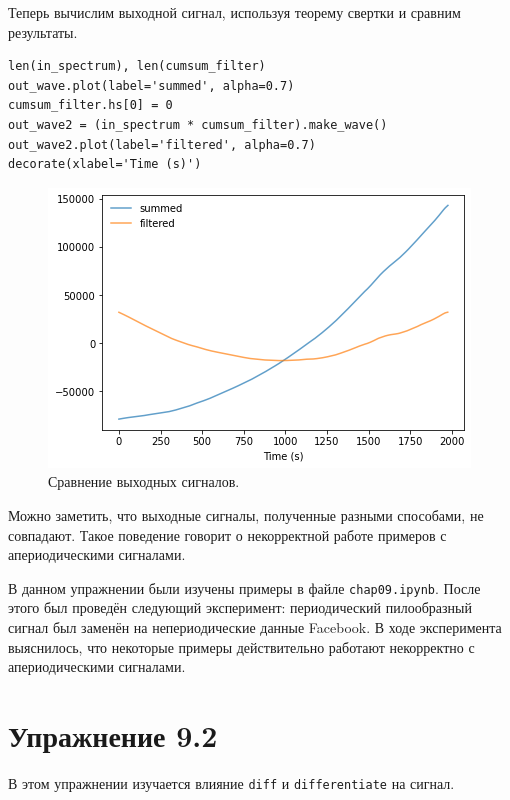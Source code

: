 \documentclass[a4paper, 14pt]{extarticle}
\begin{document}
    Теперь вычислим выходной сигнал, используя теорему свертки и сравним результаты.

    \begin{lstlisting}[caption= Вычисление выходного \texttt{wave}., label={lst:task1_compare_out_waves}]
len(in_spectrum), len(cumsum_filter)
out_wave.plot(label='summed', alpha=0.7)
cumsum_filter.hs[0] = 0
out_wave2 = (in_spectrum * cumsum_filter).make_wave()
out_wave2.plot(label='filtered', alpha=0.7)
decorate(xlabel='Time (s)') \end{lstlisting}

    \begin{figure}[H]
        \centering
        \includegraphics[width=0.65\linewidth]{resources/Images/task1_compare_out_waves}
        \caption{Сравнение выходных сигналов.}
        \label{fig:task1_compare_out_waves}
    \end{figure}

    Можно заметить, что выходные сигналы, полученные разными способами, не совпадают.
    Такое поведение говорит о некорректной работе примеров с апериодическими сигналами.

    В данном упражнении были изучены примеры в файле \texttt{chap09.ipynb}. После этого был проведён следующий эксперимент:
    периодический пилообразный сигнал был заменён на непериодические данные Facebook.
    В ходе эксперимента выяснилось, что некоторые примеры действительно работают некорректно с апериодическими сигналами.

    \newpage

    \section{Упражнение 9.2}
    \label{sec:task2}

    В этом упражнении изучается влияние \texttt{diff} и \texttt{differentiate} на сигнал.
\end{document}
